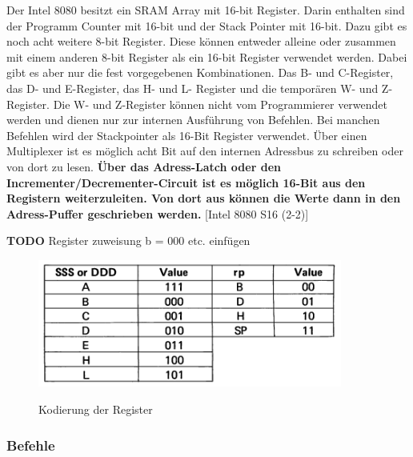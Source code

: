 \documentclass[12pt]{article}
\begin{document}
Der Intel 8080 besitzt ein SRAM Array mit 16-bit Register. Darin enthalten sind der Programm Counter mit 16-bit und der Stack Pointer mit 16-bit. Dazu gibt es noch acht weitere 8-bit Register. Diese können entweder alleine oder zusammen mit einem anderen 8-bit Register als ein 16-bit Register verwendet werden. Dabei gibt es aber nur die fest vorgegebenen Kombinationen. Das B- und C-Register, das D- und E-Register, das H- und L- Register und die temporären W- und Z- Register. Die W- und Z-Register können nicht vom Programmierer verwendet werden und dienen nur zur internen Ausführung von Befehlen. Bei manchen Befehlen wird der Stackpointer als 16-Bit Register verwendet.
Über einen Multiplexer ist es möglich acht Bit auf den internen Adressbus zu schreiben oder von dort zu lesen. \textbf{Über das Adress-Latch oder den Incrementer/Decrementer-Circuit ist es möglich 16-Bit aus den Registern weiterzuleiten. Von dort aus können die Werte dann in den Adress-Puffer geschrieben werden.} [Intel 8080 S16 (2-2)]

\textbf{TODO} Register zuweisung b = 000 etc. einfügen



\begin{figure}[h]
\caption{Kodierung der Register}
\centering
\includegraphics[width=10cm]{Bilder/register_kodierung}
\label{fig:register_kodierung}
\end{figure}

\subsubsection{Befehle}
\end{document}
